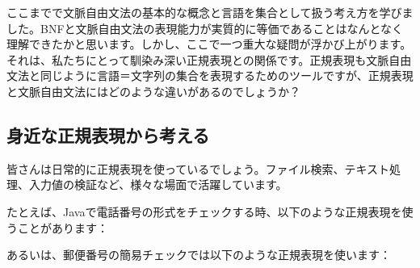 ここまでで文脈自由文法の基本的な概念と言語を集合として扱う考え方を学びました。BNFと文脈自由文法の表現能力が実質的に等価であることはなんとなく理解できたかと思います。しかし、ここで一つ重大な疑問が浮かび上がります。それは、私たちにとって馴染み深い正規表現との関係です。正規表現も文脈自由文法と同じように言語＝文字列の集合を表現するためのツールですが、正規表現と文脈自由文法にはどのような違いがあるのでしょうか？

\hypertarget{chapter4-ux8eabux8fd1ux306aux6b63ux898fux8868ux73feux304bux3089ux8003ux3048ux308b}{%
\subsection{身近な正規表現から考える}\label{chapter4-ux8eabux8fd1ux306aux6b63ux898fux8868ux73feux304bux3089ux8003ux3048ux308b}}

皆さんは日常的に正規表現を使っているでしょう。ファイル検索、テキスト処理、入力値の検証など、様々な場面で活躍しています。

たとえば、Javaで電話番号の形式をチェックする時、以下のような正規表現を使うことがあります：

\begin{Shaded}
\begin{Highlighting}[]
\SpecialCharTok{\textbackslash{}\textbackslash{}}\SpecialCharTok{\textbackslash{}\textbackslash{}}\SpecialCharTok{\textbackslash{}\textbackslash{}}\NormalTok{;  }
\NormalTok{\}}
\end{Highlighting}
\end{Shaded}

あるいは、郵便番号の簡易チェックでは以下のような正規表現を使います：

\begin{Shaded}
\begin{Highlighting}[]
\SpecialCharTok{\textbackslash{}\textbackslash{}}\SpecialCharTok{\textbackslash{}\textbackslash{}}\NormalTok{;  }
\NormalTok{\}}
\end{Highlighting}
\end{Shaded}

